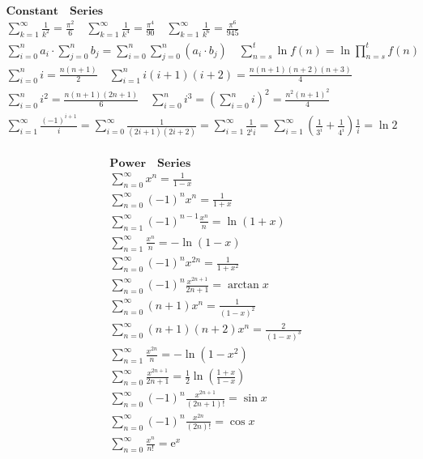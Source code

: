 \documentclass{article}
\begin{document}
\begin{align*}
    \bm{Constant \quad Series} \\  
    \sum_{k=1}^{\infty}{\frac{1}{k^2}} = \frac{\pi^2}{6} \quad \sum_{k=1}^{\infty}{\frac{1}{k^4}} = \frac{\pi^4}{90} \quad \sum_{k=1}^{\infty}{\frac{1}{k^6}} = \frac{\pi^6}{945} \\ 
    \sum_{i=0}^{n}{a_{i}} \cdot \sum_{j=0}^{n}{b_{j}} = \sum_{i=0}^{n}\sum_{j=0}^{n}{(a_{i} \cdot b_{j})} \quad \sum_{n=s}^{t}\ln{f(n)} = \ln{\prod_{n=s}^{t}}f(n) \\ 
    \sum_{i=0}^{n}{i} = \frac{n(n+1)}{2} \quad \sum_{i=1}^{n}i(i+1)(i+2)=\frac{n(n+1)(n+2)(n+3)}{4} \\ 
    \sum_{i=0}^{n}{i^2} = \frac{n(n+1)(2n+1)}{6} \quad \sum_{i=0}^{n}{i^3} = \left(\sum_{i=0}^{n}{i}\right)^2 = \frac{n^2(n+1)^2}{4} \\ 
    \sum_{i=1}^{\infty}{\frac{(-1)^{i+1}}{i}} = \sum_{i=0}^{\infty}{\frac{1}{(2i+1)(2i+2)}} = \sum_{i=1}^{\infty}{\frac{1}{2^i i}} = \sum_{i=1}^{\infty}({\frac{1}{3^i}+\frac{1}{4^i}})\frac{1}{i}= \ln2 \\ 
\end{align*}

\clearpage

\begin{align*}
    \bm{Power \quad Series} \\ 
    \sum_{n=0}^{\infty}{x^n} = \frac{1}{1-x} \\ 
    \sum_{n=0}^{\infty}{(-1)^nx^n} = \frac{1}{1+x} \\ 
    \sum_{n=1}^{\infty}{(-1)^{n-1}\frac{x^n}{n}} = \ln(1+x) \\ 
    \sum_{n=1}^{\infty}{\frac{x^n}{n}} = -\ln(1-x) \\ 
    \sum_{n=0}^{\infty}{(-1)^nx^{2n}} = \frac{1}{1+x^2} \\ 
    \sum_{n=0}^{\infty}{(-1)^{n}\frac{x^{2n+1}}{2n+1}} = \arctan x \\ 
    \sum_{n=0}^{\infty}{(n+1)x^n} = \frac{1}{(1-x)^2} \\ 
    \sum_{n=0}^{\infty}{(n+1)(n+2)x^n} = \frac{2}{(1-x)^3} \\
    \sum_{n=1}^{\infty}{\frac{x^{2n}}{n}} = -\ln(1-x^2) \\ 
    \sum_{n=0}^{\infty}{\frac{x^{2n+1}}{2n+1}} = \frac{1}{2}\ln(\frac{1+x}{1-x})\\  
    \sum_{n=0}^{\infty}{(-1)^{n} \frac{x^{2n+1}}{(2n+1)!}} = \sin x \\  
    \sum_{n=0}^{\infty}{(-1)^{n} \frac{x^{2n}}{(2n)!}} = \cos x \\  
    \sum_{n=0}^{\infty}{\frac{x^{n}}{n!}} =  \mathrm{e}^x \\ 
\end{align*}
\end{document}
